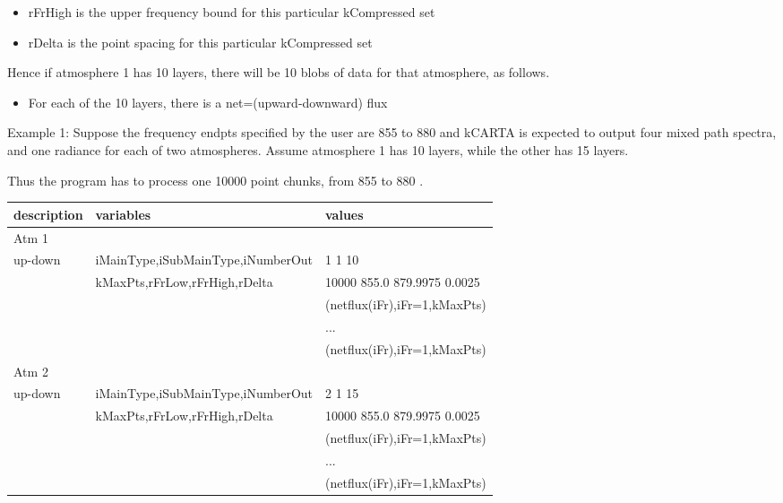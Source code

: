 \documentclass[12pt]{article}
\newcommand{\kc}{\textsf{kCARTA}\xspace}
\newlength{\colwidth}
\begin{document}
{{{{\begin{itemize}
\item rFrHigh is the upper frequency bound for this particular kCompressed 
      set\\

\item rDelta is the point spacing for this particular kCompressed set\\

\end{itemize}

Hence if atmosphere 1 has 10 layers, there will be 10  blobs of data 
for that atmosphere, as follows.

\begin{itemize}
\item
  For each of the 10 layers, there is a net=(upward-downward) flux\\
\end{itemize}


Example 1: Suppose the frequency endpts specified by the 
user are 855 to 880 \wn and \kc is expected to output four mixed path 
spectra, and one radiance for each of two atmospheres. Assume atmosphere 1 
has 10 layers, while the other has 15 layers. 

Thus the program has to process one 10000 point chunks, from  855 to 880 \wn.

\begin{longtable}{llp{\colwidth}}
description&     variables                 & values\\ \hline 
Atm 1         & & \\
up-down       & iMainType,iSubMainType,iNumberOut  & 1 1 10\\
              & kMaxPts,rFrLow,rFrHigh,rDelta  & 10000 855.0 879.9975 0.0025 \\
              & & (netflux(iFr),iFr=1,kMaxPts)\\
              & & ... \\ 
              & & (netflux(iFr),iFr=1,kMaxPts)\\
Atm 2         & & \\
up-down       & iMainType,iSubMainType,iNumberOut  & 2 1 15\\
              & kMaxPts,rFrLow,rFrHigh,rDelta  & 10000 855.0 879.9975 0.0025 \\
              & & (netflux(iFr),iFr=1,kMaxPts)\\
              & & ... \\ 
              & & (netflux(iFr),iFr=1,kMaxPts)\\
\end{longtable}

}}}}
\end{document}
